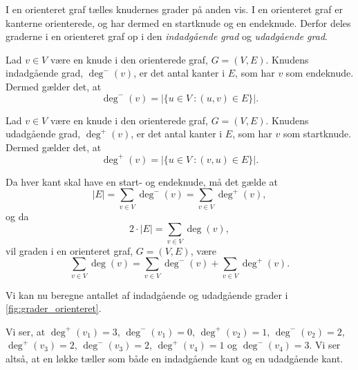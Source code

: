 I en orienteret graf tælles knudernes grader på anden vis. I en orienteret graf er kanterne orienterede, og har dermed en startknude og en endeknude. Derfor deles graderne i en orienteret graf op i den \emph{indadgående grad} og \emph{udadgående grad}. 

\begin{defn}
Lad $v \in V$ være en knude i den orienterede graf, $G = (V,E)$. Knudens indadgående grad, $\deg^-(v)$, er det antal kanter i $E$, som har $v$ som endeknude. Dermed gælder det, at
\begin{equation}
\deg^-(v)=|\{u \in V\ : (u,v) \in E \}|.
\end{equation}
\end{defn}

\begin{defn}
Lad $v \in V$ være en knude i den orienterede graf, $G = (V,E)$. Knudens udadgående grad, $\deg^+(v)$, er det antal kanter i $E$, som har $v$ som startknude. Dermed gælder det, at
\begin{equation}
\deg^+(v)=|\{u \in V\ : (v,u) \in E \}|.
\end{equation}
\end{defn}

\begin{defn}
Da hver kant skal have en start- og endeknude, må det gælde at 
\begin{equation}
|E|= \sum_{v \in V} { } \deg^{-}(v) = \sum_{v \in V} { } \deg^{+}(v),
\end{equation}
og da 
\begin{equation}
2 \cdot |E|= \sum_{v \in V} { } \deg(v),
\end{equation} 
vil graden i en orienteret graf, $G = (V,E)$, være 
\begin{equation}
\sum_{v \in V} { } \deg(v) = \sum_{v \in V} { } \deg^{-}(v) + \sum_{v \in V} { } \deg^{+}(v).
\end{equation}
\end{defn}

\begin{exmp} \label{ex:grader_orienteret}
Vi kan nu beregne antallet af indadgående og udadgående grader i \autoref{fig:grader_orienteret}.

Vi ser, at $\deg^{+}(v_{1})=3$, $\deg^{-}(v_{1})=0$, $\deg^{+}(v_{2})=1$, $\deg^{-}(v_{2})=2$, $\deg^{+}(v_{3})=2$, $\deg^{-}(v_{3})=2$, $\deg^{+}(v_{4})=1$ og $\deg^{-}(v_{4})=3$. Vi ser altså, at en løkke tæller som både en indadgående kant og en udadgående kant.
\end{exmp}


